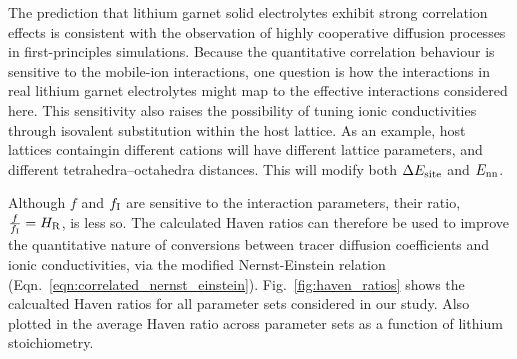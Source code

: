\documentclass[aps,prb,twocolumn,superscriptaddress,reprint]{revtex4-1}
\begin{document}
The prediction that lithium garnet solid electrolytes exhibit strong correlation effects is consistent with the observation of highly cooperative diffusion processes in first-principles simulations.\cite{JalemEtAl_ChemMater2013, MeierEtAl_JPhysChemC2014} Because the quantitative correlation behaviour is sensitive to the mobile-ion interactions, one question is how the interactions in real lithium garnet electrolytes might map to the effective interactions considered here. This sensitivity also raises the possibility of tuning ionic conductivities through isovalent substitution within the host lattice. As an example, host lattices containgin different  cations will have different lattice parameters, and different tetrahedra--octahedra distances. This will modify both $\Delta E_{\mathrm{site}}$ and $E_{\mathrm{nn}}$. 

Although $f$ and $f_{\mathrm{I}}$ are sensitive to the interaction parameters, their ratio, $\frac{f}{f_{\mathrm{I}}}=H_{\mathrm{R}}$, is less so. The calculated Haven ratios can therefore be used to improve the quantitative nature of conversions between tracer diffusion coefficients and ionic conductivities, via the modified Nernst-Einstein relation (Eqn.~\ref{eqn:correlated_nernst_einstein}). Fig.~\ref{fig:haven_ratios} shows the calcualted Haven ratios for all parameter sets considered in our study. Also plotted in the average Haven ratio across parameter sets as a function of lithium stoichiometry.
\end{document}

